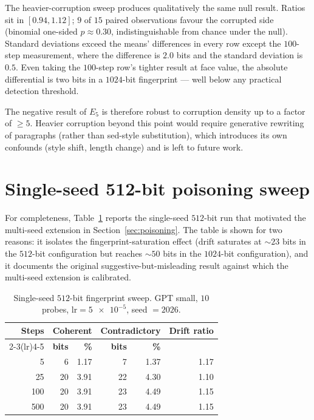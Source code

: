 \documentclass[11pt,a4paper]{article}
\begin{document}
The heavier\nobreakdash-corruption sweep produces qualitatively the
same null result.  Ratios sit in $[0.94, 1.12]$;
$9$ of $15$ paired observations favour the corrupted side
(binomial one\nobreakdash-sided $p \approx 0.30$, indistinguishable
from chance under the null).  Standard deviations exceed the
means' differences in every row except the
$100$\nobreakdash-step measurement, where the difference is
$2.0$ bits and the standard deviation is $0.5$.  Even taking the
$100$\nobreakdash-step row's tighter result at face value, the
absolute differential is two bits in a $1024$\nobreakdash-bit
fingerprint — well below any practical detection threshold.

The negative result of $E_5$ is therefore robust to corruption
density up to a factor of $\geq 5$.  Heavier corruption beyond this
point would require generative rewriting of paragraphs (rather than
sed\nobreakdash-style substitution), which introduces its own
confounds (style shift, length change) and is left to future work.

\section{Single-seed 512-bit poisoning sweep}
\label{app:poisoning-512}

For completeness, Table~\ref{tab:poisoning-512} reports the
single\nobreakdash-seed $512$\nobreakdash-bit run that motivated the
multi\nobreakdash-seed extension in Section~\ref{sec:poisoning}.
The table is shown for two reasons: it isolates the
fingerprint\nobreakdash-saturation effect (drift saturates at
$\sim\!23$ bits in the
$512$\nobreakdash-bit configuration but reaches
$\sim\!50$ bits in the $1024$\nobreakdash-bit configuration), and
it documents the original suggestive\nobreakdash-but\nobreakdash-misleading
result against which the multi\nobreakdash-seed extension is
calibrated.

\begin{table}[h]
  \centering
  \caption{Single\nobreakdash-seed $512$\nobreakdash-bit fingerprint
    sweep.  GPT small, $10$ probes,
    $\mathrm{lr} = \num{5e-5}$, seed $= 2026$.}
  \label{tab:poisoning-512}
  \begin{tabular}{r r r r r r}
    \toprule
    \multirow{2}{*}{\textbf{Steps}} &
    \multicolumn{2}{c}{\textbf{Coherent}} &
    \multicolumn{2}{c}{\textbf{Contradictory}} &
    \multirow{2}{*}{\textbf{Drift ratio}} \\
    \cmidrule(lr){2-3}\cmidrule(lr){4-5}
       & \textbf{bits} & \textbf{\%} & \textbf{bits} & \textbf{\%} & \\
    \midrule
    5    &  6 & 1.17 &  7 & 1.37 & 1.17 \\
    25   & 20 & 3.91 & 22 & 4.30 & 1.10 \\
    100  & 20 & 3.91 & 23 & 4.49 & 1.15 \\
    500  & 20 & 3.91 & 23 & 4.49 & 1.15 \\
    \bottomrule
  \end{tabular}
\end{table}
\end{document}
